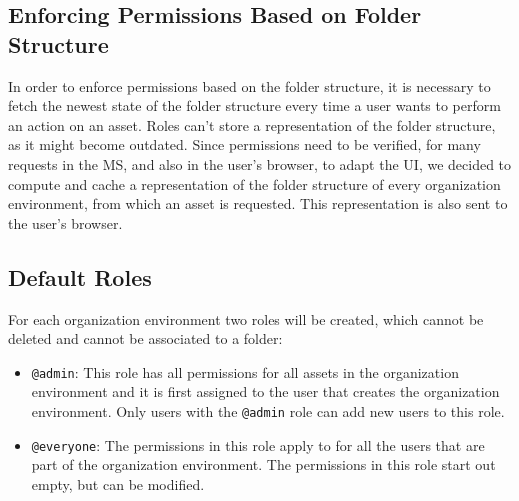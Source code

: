 \subsection{Enforcing Permissions Based on Folder Structure}

In order to enforce permissions based on the folder structure, it is necessary to fetch
the newest state of the folder structure every time a user wants to perform an action on an asset.
Roles can't store a representation of the folder structure, as it might become outdated.
Since permissions need to be verified, for many requests in the MS, and also in the user's browser, to
adapt the UI, we decided to compute and cache a representation of the folder structure of
every organization environment, from which an asset is requested.
This representation is also sent to the user's browser.


\subsection{Default Roles}

For each organization environment two roles will be created, which cannot be deleted and
cannot be associated to a folder:

\begin{itemize}
	\item \lstinline{@admin}: This role has all permissions for all assets in the
	      organization environment and it is first assigned to the user that creates the organization environment.
	      Only users with the \lstinline{@admin} role can add new users to this role.
	\item \lstinline{@everyone}: The permissions in this role apply to for all the users
	      that are part of the organization environment. The permissions in this role start out
	      empty, but can be modified.
\end{itemize}
